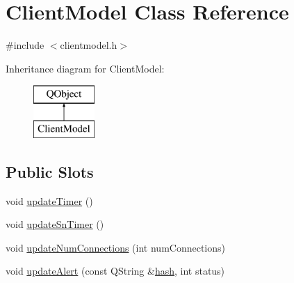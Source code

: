 \hypertarget{class_client_model}{}\section{Client\+Model Class Reference}
\label{class_client_model}


{\ttfamily \#include $<$clientmodel.\+h$>$}

Inheritance diagram for Client\+Model\+:\begin{figure}[H]
\begin{center}
\leavevmode
\includegraphics[height=2.000000cm]{class_client_model}
\end{center}
\end{figure}
\subsection*{Public Slots}
\begin{DoxyCompactItemize}
\item 
void \hyperlink{class_client_model_a82d434ebd032c00736e043ce2d36ac5e}{update\+Timer} ()
\item 
void \hyperlink{class_client_model_a52aad7741f3c1d1fb4f6177fbf2ae45a}{update\+Sn\+Timer} ()
\item 
void \hyperlink{class_client_model_a75f5a1a83e65aeb8fa01140584904967}{update\+Num\+Connections} (int num\+Connections)
\item 
void \hyperlink{class_client_model_a16758b18ded91ceba202d6023cad4b51}{update\+Alert} (const Q\+String \&\hyperlink{cache_8cc_a11ecb029164e055f28f4123ce3748862}{hash}, int status)
\end{DoxyCompactItemize}
